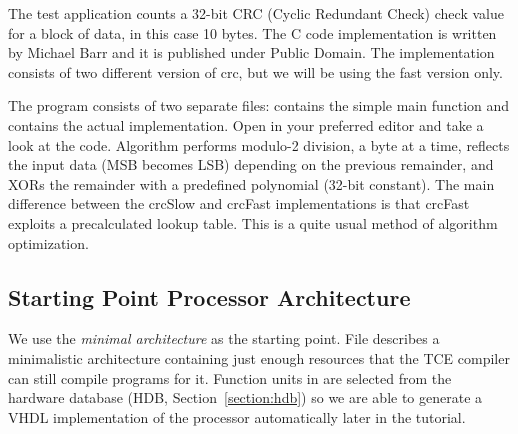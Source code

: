 \documentclass[twoside]{tceusermanual}
\begin{document}
The test application counts a 32-bit CRC (Cyclic Redundant Check)
check value for a block of data, in this case 10 bytes. The C code
implementation is written by Michael Barr and it is published under
Public Domain. The implementation consists of two different version of
crc, but we will be using the fast version only.

The program consists of two separate files:  contains the
simple main function and  contains the actual
implementation. Open  in your preferred editor and take a
look at the code. Algorithm performs modulo-2 division, a byte at a
time, reflects the input data (MSB becomes LSB) depending on the
previous remainder, and XORs the remainder with a predefined
polynomial (32-bit constant). The main difference between the crcSlow
and crcFast implementations is that crcFast exploits a precalculated
lookup table. This is a quite usual method of algorithm optimization.

% 
% 
% 

\subsection{Starting Point Processor Architecture}
\label{ssec:start_point}
We use the {\em minimal architecture} as the starting point. File
 describes a minimalistic architecture containing
just enough resources that the TCE compiler can still compile programs for it. 
Function units in  are selected from the hardware
database (HDB, Section~\ref{section:hdb}) so we are able to generate a VHDL
implementation of the processor automatically later in the tutorial.
\end{document}
